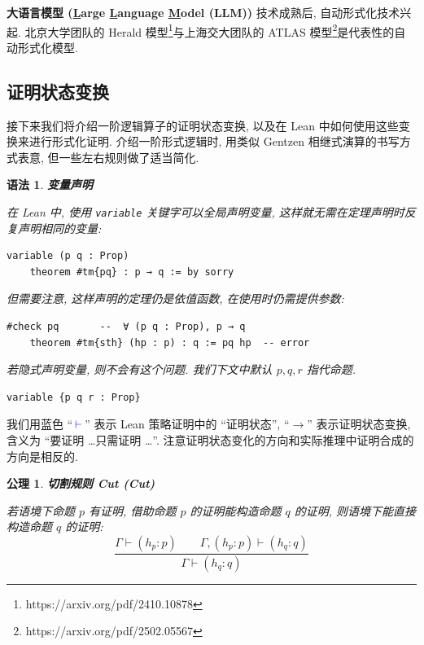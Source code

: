 \documentclass[UTF8]{ctexart}
\DeclareMathOperator{\0}{\mathbf{0}}                    %
\newcommand{\<}{\langle}
\renewcommand{\>}{\rangle}                              %
\newenvironment{thm_box}{
    \begin{tcolorbox}[enhanced, colback=thm_blue2, boxrule=0pt, frame hidden,
        borderline west={0.7mm}{0.1mm}{thm_blue1},breakable]
    }
    {\end{tcolorbox}}
\newenvironment{axm_box}{
    \begin{tcolorbox}[enhanced, colback=axm_yellow2, boxrule=0pt, frame hidden,
        borderline west={0.7mm}{0.1mm}{axm_yellow1},breakable]
    }
    {\end{tcolorbox}}
\theoremstyle{MyStyle} %
\newtheorem{axiom}{公理}[section]
\newenvironment{axm}[2]
{
    \begin{axm_box}
        \begin{axiom}
            \textbf{#1
                \ifx\relax#2\relax\else %
                    (#2) %
                \fi}
            \newline
}
{
        \end{axiom}
    \end{axm_box}
}
\newtheorem{syntax}[definition]{语法}
\newenvironment{syn}[1]
{
    \begin{thm_box}
        \begin{syntax}
            \textbf{#1}
            \newline
}
{
        \end{syntax}
    \end{thm_box}
}
\newcommand*{\lean}[1]{\texttt{\color{blue}#1}}
\newcommand{\Goal}{\texttt{\,\color{leanblue}\ensuremath{\vdash}\,}}
\begin{document}
        \textbf{大语言模型 (\underline{L}arge \underline{L}anguage \underline{M}odel (LLM))} 技术成熟后, 自动形式化技术兴起. 北京大学团队的 Herald 模型\footnote{https://arxiv.org/pdf/2410.10878}与上海交大团队的 ATLAS 模型\footnote{https://arxiv.org/pdf/2502.05567}是代表性的自动形式化模型. 

    \subsection{证明状态变换}
        
        接下来我们将介绍一阶逻辑算子的证明状态变换, 以及在 Lean 中如何使用这些变换来进行形式化证明. 介绍一阶形式逻辑时, 用类似 Gentzen 相继式演算的书写方式表意, 但一些左右规则做了适当简化. 

        \begin{syn}
            {变量声明}
            在 Lean 中, 使用 \lean{variable} 关键字可以全局声明变量, 这样就无需在定理声明时反复声明相同的变量: 
            \begin{lstlisting}[style=lean]
    variable (p q : Prop)
    theorem #tm{pq} : p → q := by sorry
            \end{lstlisting}

            但需要注意, 这样声明的定理仍是依值函数, 在使用时仍需提供参数: 
            \begin{lstlisting}[style=lean]
    #check pq       --  ∀ (p q : Prop), p → q
    theorem #tm{sth} (hp : p) : q := pq hp  -- error
            \end{lstlisting}

            若隐式声明变量, 则不会有这个问题. 我们下文中默认 $p,q,r$ 指代命题. 
            \begin{lstlisting}[style=lean]
    variable {p q r : Prop}
            \end{lstlisting}
        \end{syn}

    我们用蓝色 ``$\Goal$'' 表示 Lean 策略证明中的 ``证明状态'', ``$\longrightarrow$'' 表示证明状态变换, 含义为 ``要证明 \dots 只需证明 \dots''. 注意证明状态变化的方向和实际推理中证明合成的方向是相反的. 
        
        \begin{axm}
            {切割规则}
            {Cut}
            若语境下命题 $p$ 有证明, 借助命题 $p$ 的证明能构造命题 $q$ 的证明, 则语境下能直接构造命题 $q$ 的证明: 
            \[\frac{\Gamma\vdash(h_p : p)\qquad\Gamma,(h_p : p)\vdash(h_q : q)}{\Gamma\vdash(h_q : q)}\]
        \end{axm}
    
\end{document}
